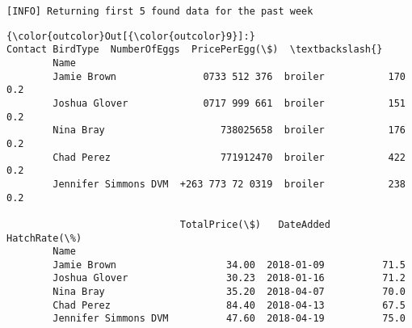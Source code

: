\documentclass[11pt]{article}
\begin{document}
    \begin{Verbatim}[commandchars=\\\{\}]
[INFO] Returning first 5 found data for the past week

    \end{Verbatim}

\begin{Verbatim}[commandchars=\\\{\}]
{\color{outcolor}Out[{\color{outcolor}9}]:}                                Contact BirdType  NumberOfEggs  PricePerEgg(\$)  \textbackslash{}
        Name                                                                            
        Jamie Brown               0733 512 376  broiler           170             0.2   
        Joshua Glover             0717 999 661  broiler           151             0.2   
        Nina Bray                    738025658  broiler           176             0.2   
        Chad Perez                   771912470  broiler           422             0.2   
        Jennifer Simmons DVM  +263 773 72 0319  broiler           238             0.2   
        
                              TotalPrice(\$)   DateAdded  HatchRate(\%)  
        Name                                                           
        Jamie Brown                   34.00  2018-01-09          71.5  
        Joshua Glover                 30.23  2018-01-16          71.2  
        Nina Bray                     35.20  2018-04-07          70.0  
        Chad Perez                    84.40  2018-04-13          67.5  
        Jennifer Simmons DVM          47.60  2018-04-19          75.0  
\end{Verbatim}
            

    
    
    
    
\end{document}
